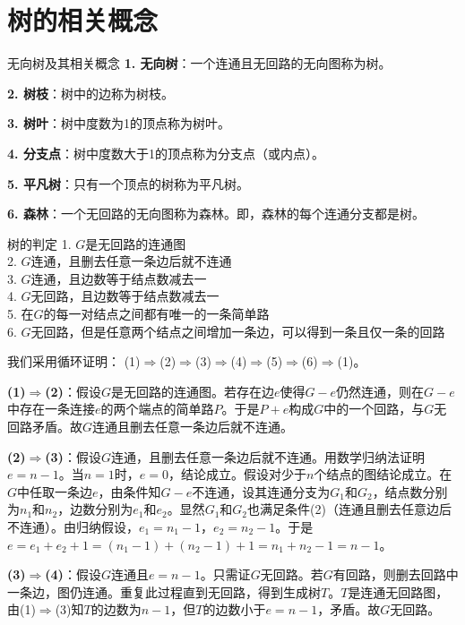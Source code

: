 \documentclass[lang=cn,11pt]{elegantbook}
\begin{document}
\section{树的相关概念}
\begin{definition}{无向树及其相关概念}
    \textbf{1. 无向树}：一个连通且无回路的无向图称为树。

    \textbf{2. 树枝}：树中的边称为树枝。

    \textbf{3. 树叶}：树中度数为1的顶点称为树叶。

    \textbf{4. 分支点}：树中度数大于1的顶点称为分支点（或内点）。

    \textbf{5. 平凡树}：只有一个顶点的树称为平凡树。

    \textbf{6. 森林}：一个无回路的无向图称为森林。即，森林的每个连通分支都是树。
\end{definition}
\begin{theorem}{树的判定}
    1. $G$是无回路的连通图\\
    2. $G$连通，且删去任意一条边后就不连通\\
    3. $G$连通，且边数等于结点数减去一\\
    4. $G$无回路，且边数等于结点数减去一\\
    5. 在$G$的每一对结点之间都有唯一的一条简单路\\
    6. $G$无回路，但是任意两个结点之间增加一条边，可以得到一条且仅一条的回路
\end{theorem}
我们采用循环证明：
(1)$\Rightarrow$(2)$\Rightarrow$(3)$\Rightarrow$(4)$\Rightarrow$(5)$\Rightarrow$(6)$\Rightarrow$(1)。

\textbf{(1)$\Rightarrow$(2)}：假设$G$是无回路的连通图。若存在边$e$使得$G-e$仍然连通，则在$G-e$中存在一条连接$e$的两个端点的简单路$P$。于是$P+e$构成$G$中的一个回路，与$G$无回路矛盾。故$G$连通且删去任意一条边后就不连通。

\textbf{(2)$\Rightarrow$(3)}：假设$G$连通，且删去任意一条边后就不连通。用数学归纳法证明$e=n-1$。当$n=1$时，$e=0$，结论成立。假设对少于$n$个结点的图结论成立。在$G$中任取一条边$e$，由条件知$G-e$不连通，设其连通分支为$G_1$和$G_2$，结点数分别为$n_1$和$n_2$，边数分别为$e_1$和$e_2$。显然$G_1$和$G_2$也满足条件(2)（连通且删去任意边后不连通）。由归纳假设，$e_1=n_1-1$，$e_2=n_2-1$。于是$e=e_1+e_2+1=(n_1-1)+(n_2-1)+1=n_1+n_2-1=n-1$。

\textbf{(3)$\Rightarrow$(4)}：假设$G$连通且$e=n-1$。只需证$G$无回路。若$G$有回路，则删去回路中一条边，图仍连通。重复此过程直到无回路，得到生成树$T$。$T$是连通无回路图，由(1)$\Rightarrow$(3)知$T$的边数为$n-1$，但$T$的边数小于$e=n-1$，矛盾。故$G$无回路。
\end{document}
